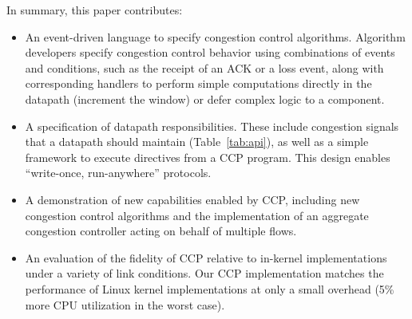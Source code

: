 \vspace{0.1in}
In summary, this paper contributes:

\begin{itemize}
\item An event-driven language to specify congestion control
  algorithms. Algorithm developers specify congestion control behavior using
  combinations of events and conditions, such as the receipt of an
  ACK or a loss event, along with corresponding handlers to perform
  simple computations directly in the datapath (\eg increment the window) or defer
  complex logic to a \userspace component.

\item A specification of datapath responsibilities. These include congestion
  signals that a datapath should maintain (Table~\ref{tab:api}), as
  well as a simple framework to execute directives from a CCP program. This
  design enables ``write-once, run-anywhere'' protocols.

\item A demonstration of new capabilities enabled by CCP, including
   new congestion control algorithms and the implementation of an
  aggregate congestion controller acting on behalf of multiple flows.

\item An evaluation of the fidelity of CCP relative to in-kernel
  implementations under a variety of link conditions. Our CCP implementation
  matches the performance of Linux kernel implementations at only a small
  overhead (5\% more CPU utilization in the worst case).

\end{itemize}

